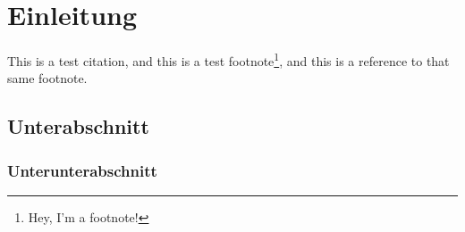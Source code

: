 \thispagestyle{plain}

\section{Einleitung}\label{intro}

\lipsum[1]

This is a test citation\cite{cry:2011}, and this is a test
footnote\footnote{\label{fn:test-fn}Hey, I'm a footnote!}, and this is a
reference to that same footnote.

\subsection{Unterabschnitt}\label{intro:subsection}

\lipsum[2]

\subsubsection{Unterunterabschnitt}\label{intro:subsubsection}

\lipsum[3]